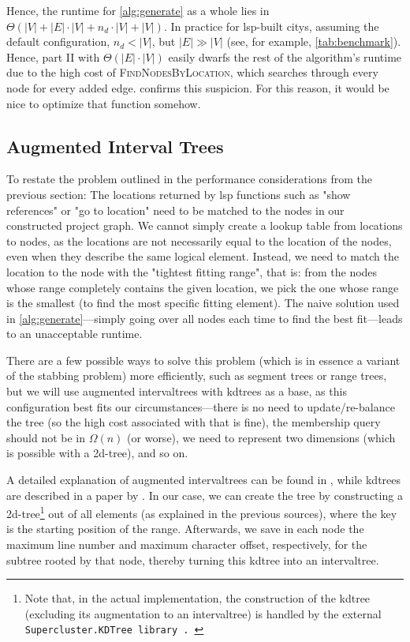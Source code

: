 \documentclass[../thesis]{subfiles}
\begin{document}
Hence, the runtime for \cref{alg:generate} as a whole lies in $\Theta(|V| + |E| \cdot |V| + n_d \cdot |V| + |V|)$.
In practice for \gls{lsp}-built \glspl{city}, assuming the default configuration, $n_d < |V|$, but $|E| \gg |V|$ (see, for example, \cref{tab:benchmark}).
Hence, part II with $\Theta(|E| \cdot |V|)$ easily dwarfs the rest of the algorithm's runtime due to the high cost of \textsc{FindNodesByLocation}, which searches through every node for every added edge.
 confirms this suspicion.
For this reason, it would be nice to optimize that function somehow.

\subsection{Augmented Interval Trees}\label{subsec:kd}
To restate the problem outlined in the performance considerations from the previous section:
The locations returned by \gls{lsp} functions such as "show references" or "go to location" need to be matched to the nodes in our constructed project graph.
We cannot simply create a lookup table from locations to nodes, as the locations are not necessarily equal to the location of the nodes, even when they describe the same logical element.
Instead, we need to match the location to the node with the "tightest fitting range",
that is: from the nodes whose \gls{range} completely contains the given location, we pick the one whose \gls{range} is the smallest (to find the most specific fitting element).
The naive solution used in \cref{alg:generate}---simply going over all nodes each time to find the best fit---leads to an unacceptable runtime.

There are a few possible ways to solve this problem (which is in essence a variant of the stabbing problem) more efficiently, such as segment trees or range trees, but we will use augmented \glspl{intervaltree} with \glspl{kdtree} as a base, as this configuration best fits our circumstances—there is no need to update/re-balance the tree (so the high cost associated with that is fine), the membership query should not be in $\Omega(n)$ (or worse), we need to represent two dimensions (which is possible with a 2d-tree), and so on.

A detailed explanation of augmented \glspl{intervaltree} can be found in \textcite[section~17.3]{cormen2022}, while \glspl{kdtree} are described in a paper by \textcite{bentley1975}.
In our case, we can create the tree by constructing a 2d-tree\footnote{
	Note that, in the actual implementation, the construction of the \gls{kdtree} (excluding its augmentation to an \gls{intervaltree}) is handled by the external \tt{Supercluster.KDTree} library~\cite{regina2017}.
} out of all elements (as explained in the previous sources), where the key is the starting position of the \gls{range}.
Afterwards, we save in each node the maximum line number and maximum character offset, respectively, for the subtree rooted by that node, thereby turning this \gls{kdtree} into an \gls{intervaltree}.
\end{document}
